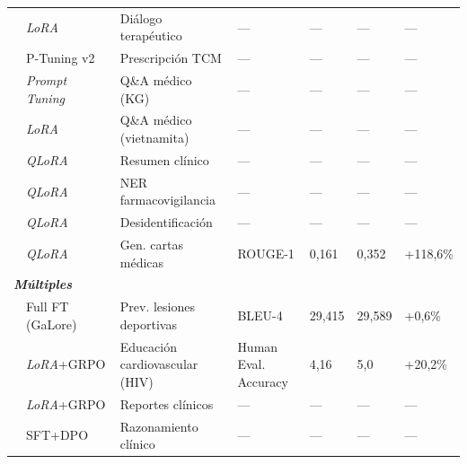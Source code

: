 \begin{longtable}{p{3.5cm} p{1.7cm} p{3.0cm} p{1.8cm} p{1.3cm} p{1.3cm} p{0.9cm}}
\scriptsize\autocite{bao2025ecbti} & \scriptsize\textit{LoRA} & \scriptsize Diálogo terapéutico & \scriptsize --- & \scriptsize --- & \scriptsize --- & \scriptsize --- \\
\scriptsize\autocite{liu2024cpmi} & \scriptsize P-Tuning v2 & \scriptsize Prescripción TCM & \scriptsize --- & \scriptsize --- & \scriptsize --- & \scriptsize --- \\
\scriptsize\autocite{yang2025ceprompt} & \scriptsize\textit{Prompt Tuning} & \scriptsize Q\&A médico (KG) & \scriptsize --- & \scriptsize --- & \scriptsize --- & \scriptsize --- \\
\scriptsize\autocite{bui2025ft} & \scriptsize\textit{LoRA} & \scriptsize Q\&A médico (vietnamita) & \scriptsize --- & \scriptsize --- & \scriptsize --- & \scriptsize --- \\
\scriptsize\autocite{chao2025evaluating} & \scriptsize\textit{QLoRA} & \scriptsize Resumen clínico & \scriptsize --- & \scriptsize --- & \scriptsize --- & \scriptsize --- \\
\scriptsize\autocite{dietrich2025ner} & \scriptsize\textit{QLoRA} & \scriptsize NER farmacovigilancia & \scriptsize --- & \scriptsize --- & \scriptsize --- & \scriptsize --- \\
\scriptsize\autocite{dormus2025harnessing} & \scriptsize\textit{QLoRA} & \scriptsize Desidentificación & \scriptsize --- & \scriptsize --- & \scriptsize --- & \scriptsize --- \\
\scriptsize\autocite{hou2024ft} & \scriptsize\textit{QLoRA} & \scriptsize Gen. cartas médicas & \scriptsize ROUGE-1 & \scriptsize 0,161 & \scriptsize 0,352 & \scriptsize +118,6\% \\
\multicolumn{7}{l}{\scriptsize\textbf{\textit{Múltiples}}} \\[2pt]
\scriptsize\autocite{zhu2025fullft} & \scriptsize Full FT (GaLore) & \scriptsize Prev. lesiones deportivas & \scriptsize BLEU-4 & \scriptsize 29,415 & \scriptsize 29,589 & \scriptsize +0,6\% \\
\scriptsize\autocite{rullo2025cardio} & \scriptsize\textit{LoRA}+GRPO & \scriptsize Educación cardiovascular (HIV) & \scriptsize Human Eval. Accuracy & \scriptsize 4,16 & \scriptsize 5,0 & \scriptsize +20,2\% \\
\scriptsize\autocite{kuo2025medical} & \scriptsize\textit{LoRA}+GRPO & \scriptsize Reportes clínicos & \scriptsize --- & \scriptsize --- & \scriptsize --- & \scriptsize --- \\
\scriptsize\autocite{savage2025dpo} & \scriptsize SFT+DPO & \scriptsize Razonamiento clínico & \scriptsize --- & \scriptsize --- & \scriptsize --- & \scriptsize --- \\
\end{longtable}

